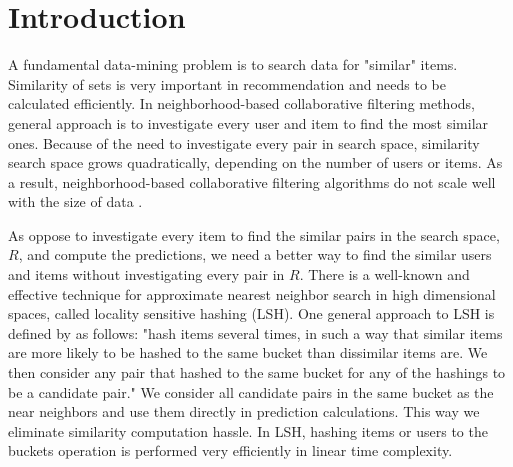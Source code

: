 \documentclass[conference]{IEEEtran}
\begin{document}





%
\IEEEpeerreviewmaketitle


\section{Introduction}

A fundamental data-mining problem is to search data for "similar" items. 
Similarity of sets is very important in recommendation and needs to be
calculated efficiently. In neighborhood-based collaborative filtering methods, 
general approach is to investigate every user and item to find the most similar 
ones. Because of the need to investigate every pair in search space, similarity 
search space grows quadratically, depending on the number of users or items. 
As a result, neighborhood-based collaborative filtering algorithms do not scale
well with the size of data \cite {DBLP:reference/rsh/DesrosiersK11}.

As oppose to investigate every item to find the similar pairs in the 
search space, $R$, and compute the predictions, we need a better 
way to find the similar users and items without investigating every pair in $R$.
There is a well-known and effective technique for approximate nearest neighbor 
search in high dimensional spaces, called locality sensitive hashing (LSH). 
One general approach to LSH is defined by \cite{Rajaraman:2011:MMD:2124405} 
as follows: "hash items several times, in such a way that similar items are 
more likely to be hashed to the same bucket than dissimilar items are. We then 
consider any pair that hashed to the same bucket for any of the hashings to be 
a candidate pair." We consider all candidate pairs in the same bucket as the 
near neighbors and use them directly in prediction calculations. This way we 
eliminate similarity computation hassle. In LSH, hashing items or users to the 
buckets operation is performed very efficiently in linear time complexity.
\end{document}
